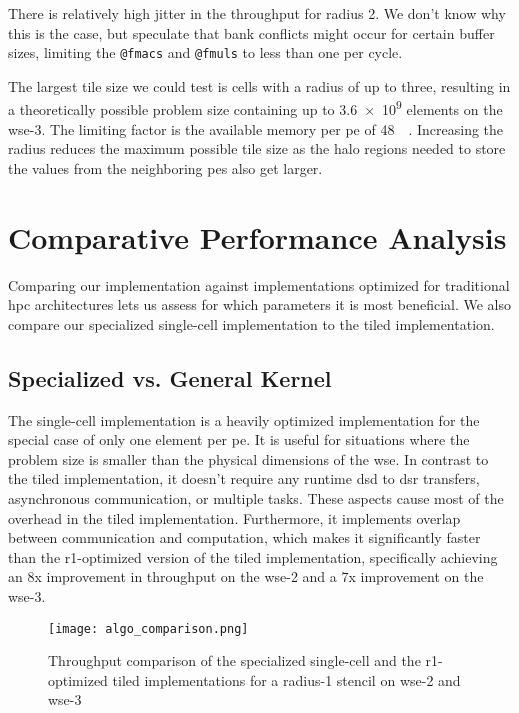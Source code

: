 There is relatively high jitter in the throughput for radius 2. We don't know why this is the case, but speculate that bank conflicts might occur for certain buffer sizes, limiting the \texttt{@fmacs} and \texttt{@fmuls} to less than one per cycle.

The largest tile size we could test is  cells with a radius of up to three, resulting in a theoretically possible problem size containing up to \num{3.6e9} elements on the \ac{wse}-3. The limiting factor is the available memory per \ac{pe} of \qty{48}{\kilo\byte}. Increasing the radius reduces the maximum possible tile size as the halo regions needed to store the values from the neighboring \acp{pe} also get larger.

\section{Comparative Performance Analysis}
Comparing our implementation against implementations optimized for traditional \ac{hpc} architectures lets us assess for which parameters it is most beneficial. We also compare our specialized single-cell implementation to the tiled implementation.  

\subsection{Specialized vs. General Kernel}
The single-cell implementation is a heavily optimized implementation for the special case of only one element per \ac{pe}. It is useful for situations where the problem size is smaller than the physical dimensions of the \ac{wse}. In contrast to the tiled implementation, it doesn't require any runtime \ac{dsd} to \ac{dsr} transfers, asynchronous communication, or multiple tasks. These aspects cause most of the overhead in the tiled implementation. Furthermore, it implements overlap between communication and computation, which makes it significantly faster than the r1-optimized version of the tiled implementation, specifically achieving an 8x improvement in throughput on the \ac{wse}-2 and a 7x improvement on the \ac{wse}-3.
\begin{figure}[h]
    \centering
    \texttt{[image: algo\_comparison.png]}
    \caption{Throughput comparison of the specialized single-cell and the r1-optimized tiled implementations for a radius-1 stencil on \ac{wse}-2 and \ac{wse}-3}
    \label{fig:algo_comparison}
\end{figure}


